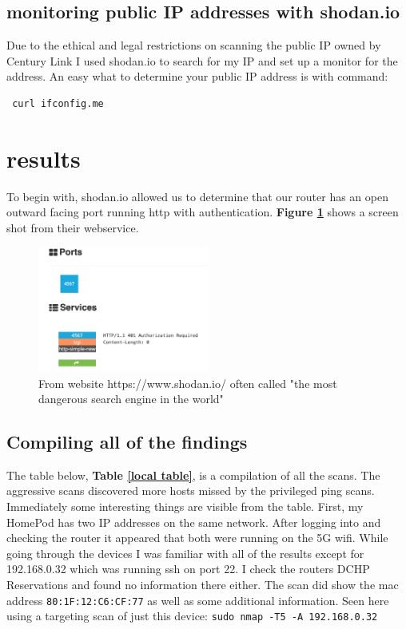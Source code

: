\documentclass[10pt]{article}
\begin{document}
\subsection*{monitoring public IP addresses with shodan.io}
Due to the ethical and legal restrictions on scanning the public IP owned by Century Link I used shodan.io to search for my IP and set up a monitor for the address.\cite{shodan}
An easy what to determine your public IP address is with command:
\begin{verbatim}
 curl ifconfig.me
\end{verbatim}

\section*{results}
To begin with, shodan.io allowed us to determine that our router has an open outward facing port running http with authentication.\cite{shodan} \textbf{Figure \ref{shodan image}} 
shows a screen shot from their webservice.

\begin{figure}[H]
\centering
\includegraphics[width=0.5\textwidth]{shodan.png}
\caption{From website https://www.shodan.io/ often called "the most dangerous search engine in the world"}\label{shodan image}
\end{figure}

\subsection*{Compiling all of the findings}
The table below, \textbf{Table \ref{local table}}, is a compilation of all the scans. The aggressive scans discovered more hosts missed by the privileged ping scans.
Immediately some interesting things are visible from the table. First, my HomePod has two IP addresses on the same network. After logging into and checking the router
it appeared that both were running on the 5G wifi. While going through the devices I was familiar with all of the results except for 192.168.0.32 which was running ssh
on port 22. I check the routers DCHP Reservations and found no information there either. The scan did show the mac address \verb|80:1F:12:C6:CF:77| as well as some
additional information. Seen here using a targeting scan of just this device: \verb|sudo nmap -T5 -A 192.168.0.32| 
\end{document}
